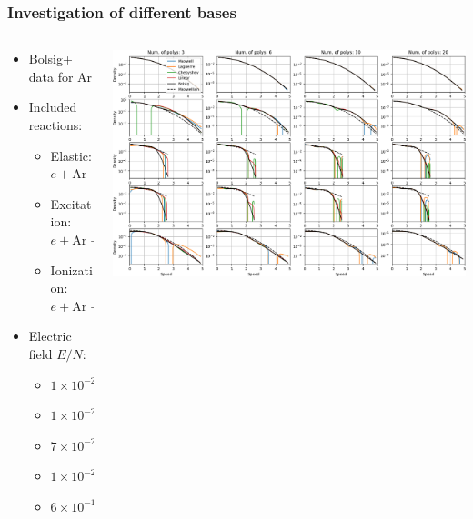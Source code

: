 \documentclass[mathserif, aspectratio=169]{beamer}
\begin{document}
\begin{frame}
\frametitle{Investigation of different bases}
%
\begin{columns}[T]
\begin{column}{0.3\linewidth}
\begin{itemize}
\item Bolsig+ \cite{?} data for Ar 
\item Included reactions:
\begin{itemize}
\item Elastic: $e + \text{Ar} \rightarrow e + \text{Ar}$
\item Excitation: $e + \text{Ar} \rightarrow e + \text{Ar}^*$
\item Ionization: $e + \text{Ar} \rightarrow e + \text{Ar}^+ + e$
\end{itemize}
\item Electric field $E/N$:
\begin{itemize}
\item $1\times 10^{-26}\, \text{V} \cdot \text{m}^2$
\item $1\times 10^{-24}\, \text{V} \cdot \text{m}^2$
\item $7\times 10^{-24}\, \text{V} \cdot \text{m}^2$
\item $1\times 10^{-23}\, \text{V} \cdot \text{m}^2$
\item $6\times 10^{-19}\, \text{V} \cdot \text{m}^2$
\end{itemize}
\end{itemize}
\end{column}
\begin{column}{0.7\linewidth}
  \vspace{-0.35in}
  \begin{center}
   \includegraphics[width=\textwidth]{figures/bolsig_visual.png}
  \end{center}
\end{column}
\end{columns}
%
\end{frame}
\end{document}
